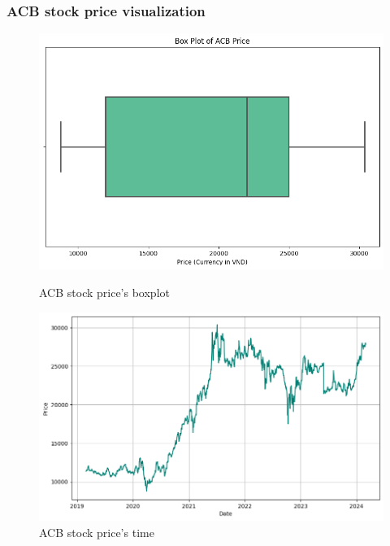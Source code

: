 \documentclass{ieeeojies}
\begin{document}
\subsubsection{ACB stock price visualization}
\begin{figure}[H]
    \centering
    \begin{minipage}{0.23\textwidth}
    \centering
    \includegraphics[width=1\textwidth]{bibliography/Figure/ACBboxplot.png}
    \caption{ACB stock price's boxplot}
    \label{fig:1}
    \end{minipage}
    \hfill
     \begin{minipage}{0.23\textwidth}
        \centering
        \includegraphics[width=\textwidth]{bibliography/Figure/ACBtime.png}
        \caption{ACB stock price's time}
        \label{fig:2}
    \end{minipage}
        \centering
    \begin{minipage}{0.23\textwidth}
    \centering

\end{minipage}
\end{figure}
\end{document}
